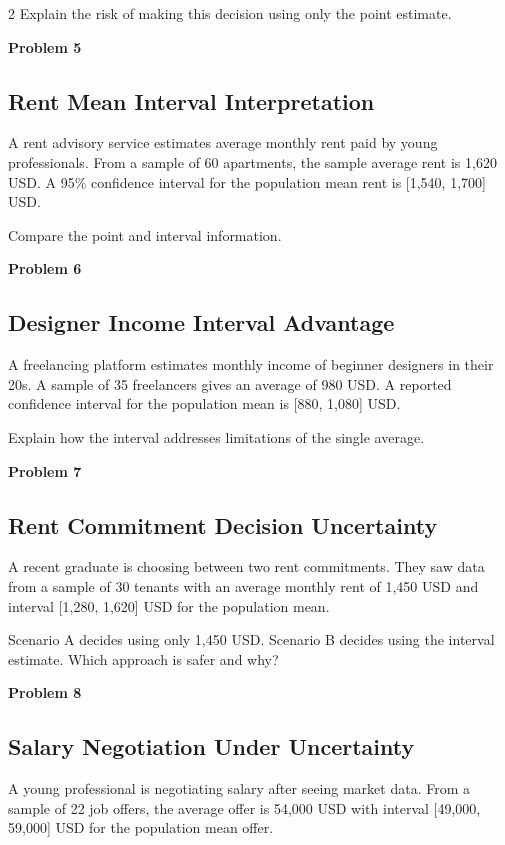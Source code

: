 \documentclass[12pt]{article}
\newcommand{\SubsectionBox}[1]{%
\noindent\colorbox{gray!30}{\parbox{\linewidth}{\textbf{#1}}}\par\vspace{0.35cm}%
}
\begin{document}
\begin{multicols}{2}
		Explain the risk of making this decision using only the point estimate.

\vspace{0.5cm}
\SubsectionBox{Problem 5}
\subsection*{Rent Mean Interval Interpretation}
A rent advisory service estimates average monthly rent paid by young professionals.
		From a sample of 60 apartments, the sample average rent is 1,620 USD.
		A 95\% confidence interval for the population mean rent is [1,540, 1,700] USD.

		Compare the point and interval information.

\vspace{0.5cm}
\SubsectionBox{Problem 6}
\subsection*{Designer Income Interval Advantage}
A freelancing platform estimates monthly income of beginner designers in their 20s.
		A sample of 35 freelancers gives an average of 980 USD.
		A reported confidence interval for the population mean is [880, 1,080] USD.

		Explain how the interval addresses limitations of the single average.

\vspace{0.5cm}
\SubsectionBox{Problem 7}
\subsection*{Rent Commitment Decision Uncertainty}
A recent graduate is choosing between two rent commitments.
		They saw data from a sample of 30 tenants with an average monthly rent of 1,450 USD and interval [1,280, 1,620] USD for the population mean.

		Scenario A decides using only 1,450 USD.
		Scenario B decides using the interval estimate.
		Which approach is safer and why?

\vspace{0.5cm}
\SubsectionBox{Problem 8}
\subsection*{Salary Negotiation Under Uncertainty}
A young professional is negotiating salary after seeing market data.
		From a sample of 22 job offers, the average offer is 54,000 USD with interval [49,000, 59,000] USD for the population mean offer.


\end{multicols}
\end{document}

